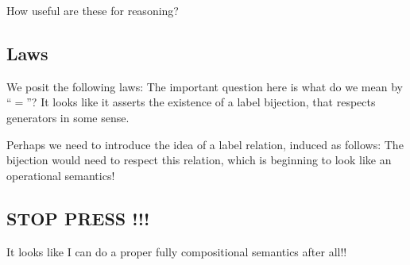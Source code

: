 How useful are these for reasoning?


\subsection{Laws}

We posit the following laws:
The important question here is what do we mean by ``$=$''?
It looks like it asserts the existence of a label bijection,
that respects generators in some sense.

Perhaps we need to introduce the idea of a label relation, induced
as follows:
The bijection would need to respect this relation,
which is beginning to look like an operational semantics!


\subsection{STOP PRESS !!!}

It looks like I can do a proper fully compositional semantics after all!!

